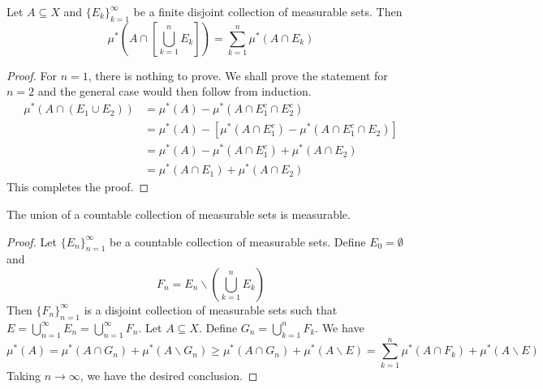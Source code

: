 \begin{proposition}
    Let $A\subseteq X$ and $\{E_k\}_{k = 1}^\infty$ be a finite disjoint collection of measurable sets. Then 
    \begin{equation*}
        \mu^*\left(A\cap\left[\bigcup_{k = 1}^n E_k\right]\right) = \sum_{k = 1}^n\mu^*(A\cap E_k)
    \end{equation*}
\end{proposition}
\begin{proof}
    For $n = 1$, there is nothing to prove. We shall prove the statement for $n = 2$ and the general case would then follow from induction. 
    \begin{align*}
        \mu^*(A\cap(E_1\cup E_2)) &= \mu^*(A) - \mu^*(A\cap E_1^c\cap E_2^c)\\
        &= \mu^*(A) - \left[\mu^*(A\cap E_1^c) - \mu^*(A\cap E_1^c\cap E_2)\right]\\
        &= \mu^*(A) - \mu^*(A\cap E_1^c) + \mu^*(A\cap E_2)\\
        &= \mu^*(A\cap E_1) + \mu^*(A\cap E_2)
    \end{align*}
    This completes the proof.
\end{proof}

\begin{proposition}
    The union of a countable collection of measurable sets is measurable.
\end{proposition}
\begin{proof}
    Let $\{E_n\}_{n = 1}^\infty$ be a countable collection of measurable sets. Define $E_0 = \emptyset$ and 
    \begin{equation*}
        F_n = E_n\backslash\left(\bigcup_{k = 1}^n E_k\right)
    \end{equation*}
    Then $\{F_n\}_{n = 1}^\infty$ is a disjoint collection of measurable sets such that $E = \bigcup_{n = 1}^\infty E_n = \bigcup_{n = 1}^\infty F_n$. Let $A\subseteq X$. Define $G_n = \bigcup_{k = 1}^n F_k$. We have 
    \begin{equation*}
        \mu^*(A) = \mu^*(A\cap G_n) + \mu^*(A\backslash G_n)\ge\mu^*(A\cap G_n) + \mu^*(A\backslash E) = \sum_{k = 1}^n\mu^*(A\cap F_k) + \mu^*(A\backslash E)
    \end{equation*}
    Taking $n\to\infty$, we have the desired conclusion.
\end{proof}

